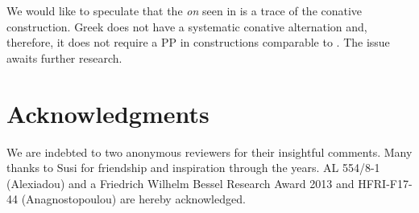 \documentclass[output=paper]{langscibook}
\begin{document}
We would like to speculate that the \textit{on} seen in  is a trace of the conative construction. 
Greek does not have a systematic conative alternation and, therefore, it does not require a PP in constructions comparable to . 
The issue awaits further research.

\section*{Acknowledgments}

We are indebted to two anonymous reviewers for their insightful comments. 
Many thanks to Susi for friendship and inspiration through the years. 
AL 554/8-1 (Alexiadou) and a Friedrich Wilhelm Bessel Research Award 2013 and HFRI-F17-44 (Anagnostopoulou) are hereby acknowledged.

{\sloppy\printbibliography[heading=subbibliography,notkeyword=this]}
\end{document}
